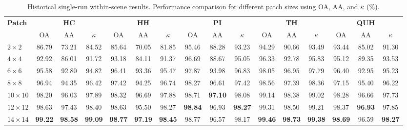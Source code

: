 \begin{table}[!ht]
\caption{Historical single-run within-scene results. Performance comparison for different patch sizes using OA, AA, and $\kappa$ (\%).}
\centering
\begin{adjustbox}{max width=\linewidth}
\begin{tabular}{|l|ccc|ccc|ccc|ccc|ccc|}
\hline
\multirow{2}{*}{\textbf{Patch}}
& \multicolumn{3}{c|}{\textbf{HC}} & \multicolumn{3}{c|}{\textbf{HH}} & \multicolumn{3}{c|}{\textbf{PI}} & \multicolumn{3}{c|}{\textbf{TH}} & \multicolumn{3}{c|}{\textbf{QUH}} \\ \cline{2-16}

& OA & AA & $\kappa$ & OA & AA & $\kappa$ & OA & AA & $\kappa$ & OA & AA & $\kappa$ & OA & AA & $\kappa$ \\
\hline

\(2 \times 2\) & 86.79 & 73.21 & 84.52 & 85.64 & 70.05 & 81.85 & 95.46 & 88.28 & 93.23 & 94.29 & 90.66 & 93.49 & 93.44 & 85.02 & 91.30 \\ \hline

\(4 \times 4\) & 92.92 & 86.01 & 91.72 & 93.18 & 84.11 & 91.37 & 96.69 & 88.67 & 95.05 & 96.33 & 92.78 & 95.83 & 95.12 & 89.35 & 93.53 \\ \hline

\(6 \times 6\) & 95.58 & 92.80 & 94.82 & 96.41 & 93.36 & 95.47 & 97.87 & 93.98 & 96.83 & 98.05 & 96.95 & 97.79 & 96.40 & 92.95 & 95.23 \\ \hline

\(8 \times 8\) & 96.94 & 94.35 & 96.42 & 97.42 & 94.25 & 96.74 & 98.27 & 96.61 & 97.42 & 98.56 & 97.39 & 98.36 & 97.15 & 95.40 & 96.22 \\ \hline

\(10 \times 10\) & 98.20 & 96.03 & 97.89 & 98.32 & 96.69 & 97.88 & 98.71 & \textbf{97.10} & 98.08 & 99.14 & 98.38 & 99.02 & 98.28 & 96.66 & 97.73 \\ \hline

\(12 \times 12\) & 98.63 & 97.43 & 98.40 & 98.63 & 95.50 & 98.27 & \textbf{98.84} & 96.93 & \textbf{98.27} & 99.31 & 98.50 & 99.21 & 98.37 & \textbf{96.93} &97.85 \\ \hline

\(14 \times 14\) & \textbf{99.22} & \textbf{98.58} & \textbf{99.09} & \textbf{98.77} & \textbf{97.19} & \textbf{98.45} & 98.77 & 96.57 & 98.17 & \textbf{99.46} & \textbf{98.73} & \textbf{99.38} & \textbf{98.69} & 96.59 & \textbf{98.27} \\ \hline

\end{tabular}
\end{adjustbox}
\label{tab:patch_acc}
\end{table}










